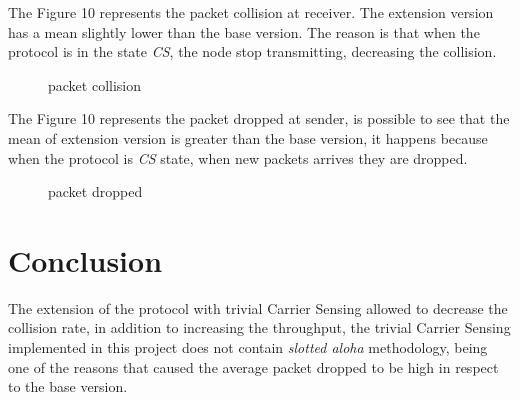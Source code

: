 \documentclass[conference]{IEEEtran}
\begin{document}
The Figure 10 represents the packet collision at receiver. The extension version has a mean slightly lower than the base version. The reason is that when the protocol is in the state \textit{CS}, the node stop transmitting, decreasing the collision.

\begin{figure}[H]
	\centering	 
	\caption{packet collision}%
\end{figure}


The Figure 10 represents the packet dropped at sender, is possible to see that the mean of extension version is greater than the base version, it happens  because when the protocol is \textit{CS} state, when new packets arrives they are dropped.

\begin{figure}[H]
	\centering	 
	\caption{packet dropped}%
\end{figure}

\section{Conclusion}
The extension of the protocol with trivial Carrier Sensing allowed to decrease the collision rate, in addition to increasing the throughput, the trivial Carrier Sensing implemented in this project does not contain \textit{slotted aloha} methodology, being one of the reasons that caused the average packet dropped to be high in respect to the base version.
\end{document}
